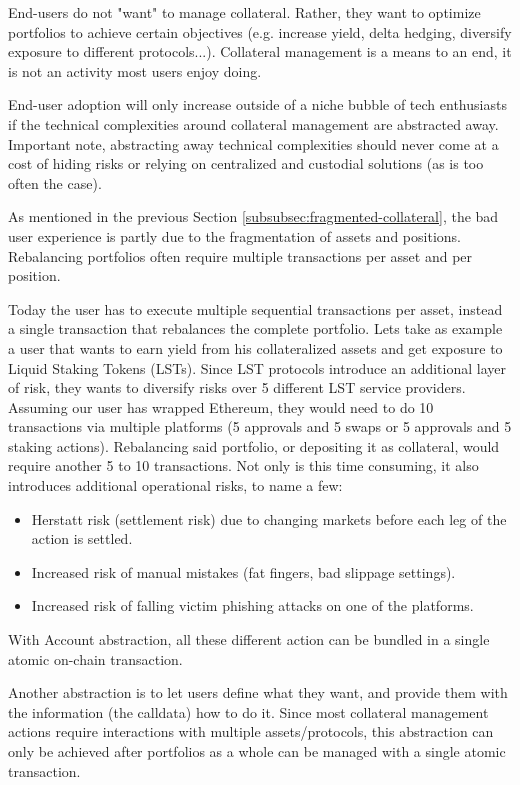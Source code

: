 \documentclass[sigconf,nonacm]{acmart}
\begin{document}
End-users do not "want" to manage collateral.
Rather, they want to optimize portfolios to achieve certain objectives (e.g. increase yield, delta hedging, diversify exposure to different protocols...).
Collateral management is a means to an end, it is not an activity most users enjoy doing.

End-user adoption will only increase outside of a niche bubble of tech enthusiasts if the technical complexities around collateral management are abstracted away.
Important note, abstracting away technical complexities should never come at a cost of hiding risks or relying on centralized and custodial solutions (as is too often the case).

As mentioned in the previous Section \ref{subsubsec:fragmented-collateral}, the bad user experience is partly due to the fragmentation of assets and positions.
Rebalancing portfolios often require multiple transactions per asset and per position.

Today the user has to execute multiple sequential transactions per asset, instead a single transaction that rebalances the complete portfolio.
Lets take as example a user that wants to earn yield from his collateralized assets and get exposure to Liquid Staking Tokens (LSTs).
Since LST protocols introduce an additional layer of risk, they wants to diversify risks over 5 different LST service providers.
Assuming our user has wrapped Ethereum, they would need to do 10 transactions via multiple platforms (5 approvals and 5 swaps or 5 approvals and 5 staking actions).
Rebalancing said portfolio, or depositing it as collateral, would require another 5 to 10 transactions.
Not only is this time consuming, it also introduces additional operational risks, to name a few:
 \begin{itemize}
    \item Herstatt risk (settlement risk) due to changing markets before each leg of the action is settled.
    \item Increased risk of manual mistakes (fat fingers, bad slippage settings).
    \item Increased risk of falling victim phishing attacks on one of the platforms. 
\end{itemize}
With Account abstraction, all these different action can be bundled in a single atomic on-chain transaction.

Another abstraction is to let users define what they want, and provide them with the information (the calldata) how to do it.
Since most collateral management actions require interactions with multiple assets/protocols,
this abstraction can only be achieved after portfolios as a whole can be managed with a single atomic transaction.
\end{document}
